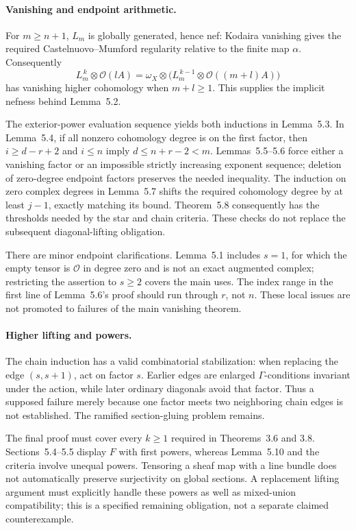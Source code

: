 \documentclass[10pt]{article}
\begin{document}
\paragraph*{Vanishing and endpoint arithmetic.}\mbox{}\par
For \(m\ge n+1\), \(L_m\) is globally generated, hence nef: Kodaira vanishing gives the required Castelnuovo–Mumford regularity relative to the finite map \(\alpha\). Consequently \[L_m^{\,k}\otimes\mathcal O(lA)
 =\omega_X\otimes\bigl(L_m^{\,k-1}\otimes\mathcal O((m+l)A)\bigr)\] has vanishing higher cohomology when \(m+l\ge1\). This supplies the implicit nefness behind Lemma 5.2.\par
The exterior-power evaluation sequence yields both inductions in Lemma 5.3. In Lemma 5.4, if all nonzero cohomology degree is on the first factor, then \(i\ge d-r+2\) and \(i\le n\) imply \(d\le n+r-2<m\). Lemmas 5.5–5.6 force either a vanishing factor or an impossible strictly increasing exponent sequence; deletion of zero-degree endpoint factors preserves the needed inequality. The induction on zero complex degrees in Lemma 5.7 shifts the required cohomology degree by at least \(j-1\), exactly matching its bound. Theorem 5.8 consequently has the thresholds needed by the star and chain criteria. These checks do not replace the subsequent diagonal-lifting obligation.\par
There are minor endpoint clarifications. Lemma 5.1 includes \(s=1\), for which the empty tensor is \(\mathcal O\) in degree zero and is not an exact augmented complex; restricting the assertion to \(s\ge2\) covers the main uses. The index range in the first line of Lemma 5.6’s proof should run through \(r\), not \(n\). These local issues are not promoted to failures of the main vanishing theorem.\par
\paragraph*{Higher lifting and powers.}\mbox{}\par
The chain induction has a valid combinatorial stabilization: when replacing the edge \((s,s+1)\), act on factor \(s\). Earlier edges are enlarged \(\Gamma\)-conditions invariant under the action, while later ordinary diagonals avoid that factor. Thus a supposed failure merely because one factor meets two neighboring chain edges is not established. The ramified section-gluing problem remains.\par
The final proof must cover every \(k\ge1\) required in Theorems 3.6 and 3.8. Sections 5.4–5.5 display \(F\) with first powers, whereas Lemma 5.10 and the criteria involve unequal powers. Tensoring a sheaf map with a line bundle does not automatically preserve surjectivity on global sections. A replacement lifting argument must explicitly handle these powers as well as mixed-union compatibility; this is a specified remaining obligation, not a separate claimed counterexample.\par
\end{document}
